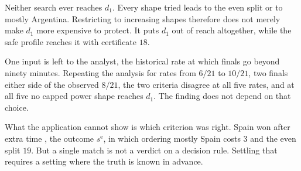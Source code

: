 Neither search ever reaches $d_1$. Every shape tried leads to the even split
or to mostly Argentina. Restricting to increasing shapes therefore does not
merely make $d_1$ more expensive to protect. It puts $d_1$ out of reach
altogether, while the safe profile reaches it with certificate $18$.

One input is left to the analyst, the historical rate at which finals go
beyond ninety minutes. Repeating the analysis for rates from $6/21$ to
$10/21$, two finals either side of the observed $8/21$, the two criteria
disagree at all five rates, and at all five no capped power shape reaches
$d_1$. The finding does not depend on that choice.

What the application cannot show is which criterion was right. Spain won
after extra time \citep{AlJazeera2026final}, the outcome $s^{\mathrm e}$, in which
ordering mostly Spain costs $3$ and the even split $19$. But a single match is
not a verdict on a decision rule. Settling that requires a setting where the
truth is known in advance.

